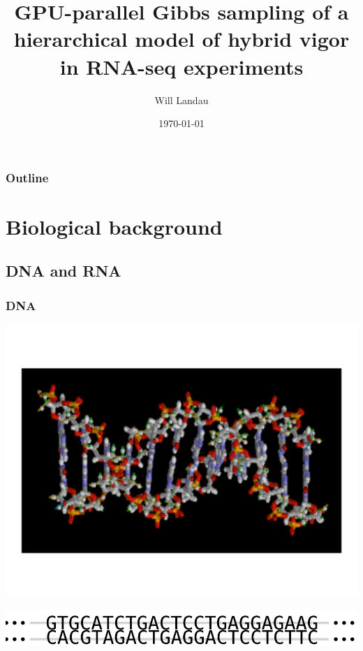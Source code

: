 \documentclass[handout]{beamer}
\title{GPU-parallel Gibbs sampling of a hierarchical model of hybrid vigor in RNA-seq experiments}
\author{Will Landau}
\date{\today}
\institute{Iowa State University}
\numberwithin{equation}{section}
\begin{document}
\begin{frame}
\titlepage
 \end{frame}
 
\begin{frame}
\frametitle{Outline}
\tableofcontents
\end{frame}


\section{Biological background}

\subsection{DNA and RNA}


\begin{frame}
\frametitle{DNA}
\begin{center}
\includegraphics[scale=.23]{fig/dna-img}
\end{center}
\begin{center}
\includegraphics[scale=.23]{fig/dna.png}
\end{center}
\end{frame}
\end{document}
